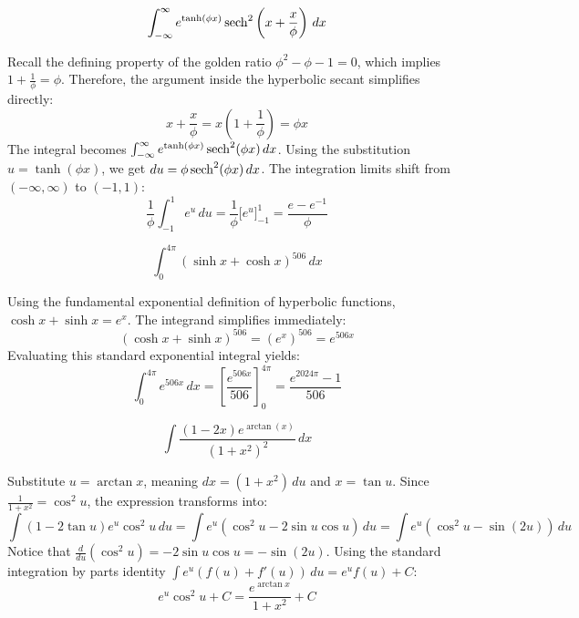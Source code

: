\begin{questions}
    \question \[ \int_{-\infty}^{\infty} e^{\tanh(\phi x)} \operatorname{sech}^2\left(x + \frac{x}{\phi}\right) \,dx \]
    \begin{solution}
        Recall the defining property of the golden ratio $\phi^2 - \phi - 1 = 0$, which implies $1 + \frac{1}{\phi} = \phi$. Therefore, the argument inside the hyperbolic secant simplifies directly:
        \[ x + \frac{x}{\phi} = x\left(1 + \frac{1}{\phi}\right) = \phi x \]
        The integral becomes $\int_{-\infty}^{\infty} e^{\tanh(\phi x)} \operatorname{sech}^2(\phi x) \,dx$. Using the substitution $u = \tanh(\phi x)$, we get $du = \phi \operatorname{sech}^2(\phi x) \,dx$. The integration limits shift from $(-\infty, \infty)$ to $(-1, 1)$:
        \[ \frac{1}{\phi} \int_{-1}^{1} e^u \,du = \frac{1}{\phi} \Big[ e^u \Big]_{-1}^1 = \frac{e - e^{-1}}{\phi} \]
    \end{solution}

    \question \[ \int_{0}^{4\pi} (\sinh x + \cosh x)^{506} \,dx \]
    \begin{solution}
        Using the fundamental exponential definition of hyperbolic functions, $\cosh x + \sinh x = e^x$. The integrand simplifies immediately:
        \[ (\cosh x + \sinh x)^{506} = (e^x)^{506} = e^{506x} \]
        Evaluating this standard exponential integral yields:
        \[ \int_{0}^{4\pi} e^{506x} \,dx = \left[ \frac{e^{506x}}{506} \right]_0^{4\pi} = \frac{e^{2024\pi} - 1}{506} \]
    \end{solution}

    \question \[ \int \frac{(1 - 2x)e^{\arctan(x)}}{(1 + x^2)^2} \,dx \]
    \begin{solution}
        Substitute $u = \arctan x$, meaning $dx = (1+x^2) \,du$ and $x = \tan u$. Since $\frac{1}{1+x^2} = \cos^2 u$, the expression transforms into:
        \[ \int (1 - 2\tan u)e^u \cos^2 u \,du = \int e^u (\cos^2 u - 2\sin u\cos u) \,du = \int e^u (\cos^2 u - \sin(2u)) \,du \]
        Notice that $\frac{d}{du}(\cos^2 u) = -2\sin u\cos u = -\sin(2u)$. Using the standard integration by parts identity $\int e^u (f(u) + f'(u)) \,du = e^u f(u) + C$:
        \[ e^u \cos^2 u + C = \frac{e^{\arctan x}}{1 + x^2} + C \]
    \end{solution}

\end{questions}

